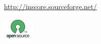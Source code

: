 \begin{frame}
	\frametitle{}	
	\begin{center}
	
	\bigskip
	{\color[rgb]{0.5,0,0}{\Huge INScore} \\ 
	\vspace{5mm}
	{\LARGE{}}} \\
	\href{http://inscore.sourceforge.net/}{http://inscore.sourceforge.net/}
	
	\bigskip
	\bigskip
	\includegraphics[width=15mm]{imgs/opensource} \\
	\end{center}
	
\end{frame}





